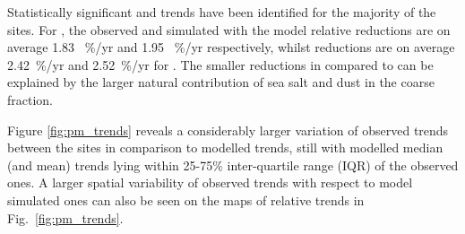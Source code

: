 Statistically significant \PM[10] and \PM[2.5] trends have been identified for the majority of the sites. For \PM[10], the observed and simulated with the model relative reductions are on average 1.83 ~\%/yr and 1.95 ~\%/yr respectively, whilst reductions are on average 2.42~\%/yr and 2.52~\%/yr for \PM[2.5]. The smaller reductions in \PM[10] compared to \PM[2.5] can be explained by the larger natural contribution of sea salt and dust in the coarse fraction. 


Figure \ref{fig:pm_trends} reveals a considerably larger variation of observed trends between the sites in comparison to modelled trends, still with modelled median (and mean) trends lying within 25-75\% inter-quartile range (IQR) of the observed ones. A larger spatial variability of observed trends with respect to model simulated ones can also be seen on the maps of relative trends in Fig.~\ref{fig:pm_trends}. 

